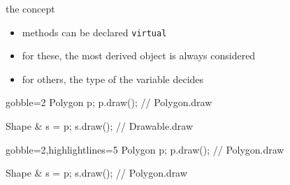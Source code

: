 \begin{frame}[fragile]
  \begin{block}{the concept}
    \begin{itemize}
    \item methods can be declared \texttt{virtual}
    \item for these, the most derived object is always considered
    \item for others, the type of the variable decides
    \end{itemize}
  \end{block}
  \begin{overprint}
  \begin{multicols}{2}
    \begin{cppcode*}{gobble=2}
      Polygon p;
      p.draw(); // Polygon.draw

      Shape & s = p;
      s.draw(); // Drawable.draw
    \end{cppcode*}
    \columnbreak
    \center
  \end{multicols}

    \begin{multicols}{2}
    \begin{cppcode*}{gobble=2,highlightlines=5}
      Polygon p;
      p.draw(); // Polygon.draw

      Shape & s = p;
      s.draw(); // Polygon.draw
    \end{cppcode*}
    \columnbreak
    \center
  \end{multicols}
  \end{overprint}
\end{frame}

